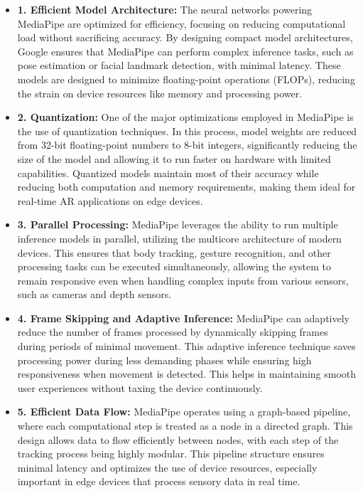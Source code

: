 \begin{itemize}
    \item \textbf{1. Efficient Model Architecture:} The neural networks powering MediaPipe are optimized for efficiency, focusing on reducing computational load without sacrificing accuracy. By designing compact model architectures, Google ensures that MediaPipe can perform complex inference tasks, such as pose estimation or facial landmark detection, with minimal latency. These models are designed to minimize floating-point operations (FLOPs), reducing the strain on device resources like memory and processing power.
    \item \textbf{2. Quantization:} One of the major optimizations employed in MediaPipe is the use of quantization techniques. In this process, model weights are reduced from 32-bit floating-point numbers to 8-bit integers, significantly reducing the size of the model and allowing it to run faster on hardware with limited capabilities. Quantized models maintain most of their accuracy while reducing both computation and memory requirements, making them ideal for real-time AR applications on edge devices.
    \item \textbf{3. Parallel Processing:} MediaPipe leverages the ability to run multiple inference models in parallel, utilizing the multicore architecture of modern devices. This ensures that body tracking, gesture recognition, and other processing tasks can be executed simultaneously, allowing the system to remain responsive even when handling complex inputs from various sensors, such as cameras and depth sensors.
    \item \textbf{4. Frame Skipping and Adaptive Inference:} MediaPipe can adaptively reduce the number of frames processed by dynamically skipping frames during periods of minimal movement. This adaptive inference technique saves processing power during less demanding phases while ensuring high responsiveness when movement is detected. This helps in maintaining smooth user experiences without taxing the device continuously.
    \item \textbf{5. Efficient Data Flow:} MediaPipe operates using a graph-based pipeline, where each computational step is treated as a node in a directed graph. This design allows data to flow efficiently between nodes, with each step of the tracking process being highly modular. This pipeline structure ensures minimal latency and optimizes the use of device resources, especially important in edge devices that process sensory data in real time.
\end{itemize}

